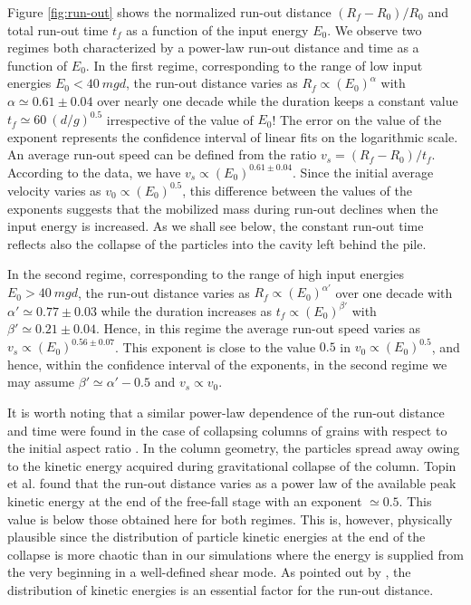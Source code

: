 Figure \ref{fig:run-out} shows the normalized run-out distance $(R_f - R_0)/R_0$ 
and total run-out time $t_f$ as a function of the input energy $E_0$. We observe 
two regimes both characterized by a power-law run-out distance and time as a 
function of $E_0$. In the first regime, corresponding to the range of low input 
energies $E_0 < 40 \ mgd$, the run-out distance varies as $R_f \propto 
(E_0)^\alpha$ with $\alpha \simeq 0.61 \pm 0.04$ over nearly one decade while 
the duration keeps a constant value  $t_f \simeq 60 \  (d/g)^{0.5}$ 
irrespective of the value of $E_0$! The error  on the value of the exponent 
represents the confidence interval of linear fits on the logarithmic scale.  
An average run-out speed can be defined from the ratio $v_s = (R_f - R_0) / 
t_f$. According to the data, we have $v_s \propto (E_0)^{0.61\pm 0.04}$. Since 
the initial average velocity varies as $v_0 \propto (E_0)^{0.5}$, this 
difference between the values of the exponents suggests that the mobilized mass 
during run-out declines when the input energy is increased. As we shall see 
below, the constant run-out time reflects also the collapse of the particles 
into the cavity left behind the pile. 

In the second regime, corresponding to the range of high input energies  $E_0 > 
40 \ mgd$, the run-out distance varies as $R_f \propto (E_0)^{\alpha'}$ over one 
decade with $\alpha' \simeq 0.77\pm 0.03$ while the duration increases as $t_f 
\propto (E_0)^{\beta'}$ with $\beta' \simeq 0.21 \pm 0.04$. Hence, in this 
regime the average run-out speed varies as $v_s \propto (E_0)^{0.56 \pm 0.07}$. 
This exponent is close to the value $0.5$ in $v_0 \propto (E_0)^{0.5}$, and 
hence, within the confidence interval of the exponents, in the second regime we 
may assume $\beta' \simeq \alpha' - 0.5$ and $v_s \propto v_0$. 

It is worth noting that a similar power-law dependence of the 
run-out distance and time were found in the case of 
collapsing columns of grains with respect to the initial aspect ratio 
\cite{Topin2012}.  
In the column geometry, the particles spread away owing to the 
kinetic energy acquired during gravitational collapse of the column. 
Topin et al. found that the run-out distance varies as a power law 
of the available peak kinetic energy at the end of the free-fall stage with an 
exponent $\simeq 0.5$. This value is below those obtained here 
for both regimes. This is, however, physically plausible since the   
distribution of particle kinetic energies at the end of the collapse 
is more chaotic than in our simulations where the energy is supplied 
from the very beginning in a well-defined shear mode. As pointed out 
by \cite{Staron2005}, the distribution of kinetic energies is an essential 
factor for the run-out distance.

